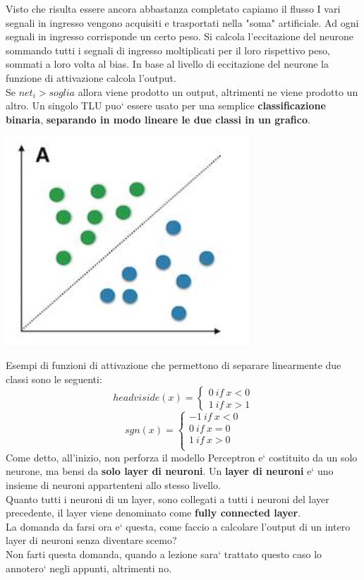 Visto che risulta essere ancora abbastanza completato capiamo il flusso 
{
    I vari segnali in ingresso vengono acquisiti e trasportati nella "soma" 
    artificiale.
}
{
    Ad ogni segnali in ingresso corrisponde un certo peso.
}
{
    Si calcola l'eccitazione del neurone sommando tutti i segnali di ingresso 
%
    moltiplicati per il loro rispettivo peso, sommati a loro volta al bias.
}
{
    In base al livello di eccitazione del neurone la funzione di attivazione 
% 
    calcola l'output.
\\
    Se \(net_i > soglia\) allora viene prodotto un output, altrimenti ne viene 
%
    prodotto un altro.
}
Un singolo TLU puo` essere usato per una semplice \textbf{classificazione binaria},
\textbf{separando in modo lineare le due classi in un grafico}.
\begin{center}
    \includegraphics[scale=0.5]{images/Separabilita_lineare.png}
\end{center}
Esempi di funzioni di attivazione che permettono di separare linearmente due 
%
classi sono le seguenti:
\[
    headviside(x)=\begin{cases}
        0\ if\ x < 0\\
        1\ if\ x > 1
    \end{cases}
\]
\[
    sgn(x)=\begin{cases}
        -1\ if\ x < 0\\
         0\ if\ x = 0\\
         1\ if\ x > 0\\
    \end{cases}
\]
Come detto, all'inizio, non perforza il modello Perceptron e` costituito da un 
%
solo neurone, ma bensi da \textbf{solo layer di neuroni}.
%
Un \textbf{layer di neuroni} e` uno insieme di neuroni appartenteni allo stesso 
%
livello.
\\
Quanto tutti i neuroni di un layer, sono collegati a tutti i neuroni del layer 
%
precedente, il layer viene denominato come \textbf{fully connected layer}.
\\ 
La domanda da farsi ora e` questa, come faccio a calcolare l'output di un intero
%
layer di neuroni senza diventare scemo? 
\\
Non farti questa domanda, quando a lezione sara` trattato questo caso 
%
lo annotero` negli appunti, altrimenti no.

 